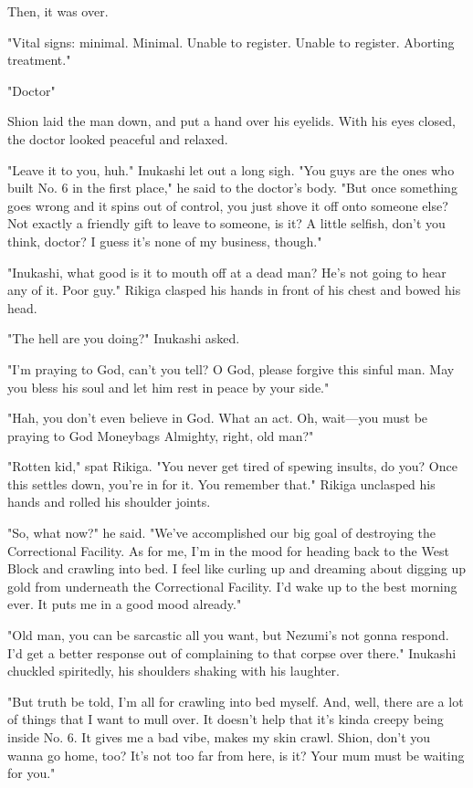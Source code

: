 Then, it was over.

{\sffamily "Vital signs: minimal. Minimal. Unable to register. Unable to register.
Aborting treatment."}

"Doctor\el "

Shion laid the man down, and put a hand over his eyelids. With his eyes
closed, the doctor looked peaceful and relaxed.

"Leave it to you, huh." Inukashi let out a long sigh. "You guys are the
ones who built No. 6 in the first place," he said to the doctor's body.
"But once something goes wrong and it spins out of control, you just
shove it off onto someone else? Not exactly a friendly gift to leave to
someone, is it? A little selfish, don't you think, doctor? I guess it's
none of my business, though."

"Inukashi, what good is it to mouth off at a dead man? He's not going to
hear any of it. Poor guy." Rikiga clasped his hands in front of his
chest and bowed his head.

"The hell are you doing?" Inukashi asked.

"I'm praying to God, can't you tell? O God, please forgive this sinful
man. May you bless his soul and let him rest in peace by your side."

"Hah, you don't even believe in God. What an act. Oh, wait---you must be
praying to God Moneybags Almighty, right, old man?"

"Rotten kid," spat Rikiga. "You never get tired of spewing insults, do
you? Once this settles down, you're in for it. You remember that."
Rikiga unclasped his hands and rolled his shoulder joints.

"So, what now?" he said. "We've accomplished our big goal of destroying
the Correctional Facility. As for me, I'm in the mood for heading back
to the West Block and crawling into bed. I feel like curling up and
dreaming about digging up gold from underneath the Correctional
Facility. I'd wake up to the best morning ever. It puts me in a good
mood already."

"Old man, you can be sarcastic all you want, but Nezumi's not gonna
respond. I'd get a better response out of complaining to that corpse
over there." Inukashi chuckled spiritedly, his shoulders shaking with
his laughter.

"But truth be told, I'm all for crawling into bed myself. And, well,
there are a lot of things that I want to mull over. It doesn't help that
it's kinda creepy being inside No. 6. It gives me a bad vibe, makes my
skin crawl. Shion, don't you wanna go home, too? It's not too far from
here, is it? Your mum must be waiting for you."

